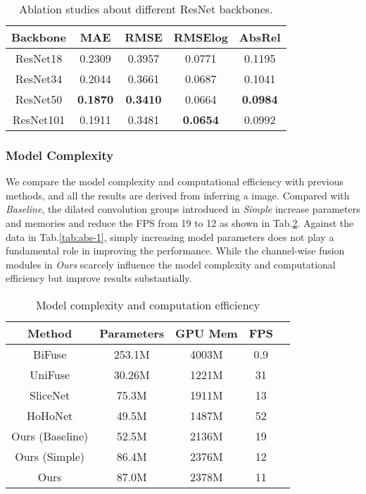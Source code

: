 \documentclass[letterpaper]{article} \usepackage{aaai21}  \usepackage{times}  \usepackage{helvet} \usepackage{courier}  \usepackage[hyphens]{url}  \usepackage{graphicx} \urlstyle{rm} \def\UrlFont{\rm}  \usepackage{natbib}  \usepackage{caption} \frenchspacing  \setlength{\pdfpagewidth}{8.5in}  \setlength{\pdfpageheight}{11in}
\newcommand{\newchange}[1]{{\color{black}#1}}
\begin{document}
\begin{table}[tb]
    \centering
    \begin{tabular}{ccccc} 
\toprule 
Backbone & MAE & RMSE & RMSElog &  AbsRel \\
\midrule 
ResNet18 & 0.2309 & 0.3957 & 0.0771 & 0.1195 \\
ResNet34 & 0.2044 & 0.3661 & 0.0687 & 0.1041 \\
ResNet50 & \textbf{0.1870} & \textbf{0.3410} & 0.0664 & \textbf{0.0984} \\
ResNet101 & 0.1911 & 0.3481 & \textbf{0.0654} & 0.0992 \\ 
\bottomrule
    \end{tabular}
    \caption{Ablation studies about different ResNet backbones.}
    \label{tab:abs-6}
\end{table}

\newchange{
\subsubsection{Model Complexity}
We compare the model complexity and computational efficiency with previous methods, and all the results are derived from inferring a  image.
Compared with \textit{Baseline}, the dilated convolution groups introduced in \textit{Simple} increase  parameters and  memories and reduce the FPS from 19 to 12 as shown in Tab.\ref{tab:abs-7}.
Against the data in Tab.\ref{tab:abs-1}, simply increasing model parameters does not play a fundamental role in improving the performance. While the channel-wise fusion modules in \textit{Ours} scarcely influence the model complexity and computational efficiency but improve results substantially.

\begin{table}[tb]
\centering
\small
\begin{tabular}{ccccc} 
\toprule 
Method & Parameters & GPU Mem & FPS\\
\midrule 
BiFuse & 253.1M & 4003M & 0.9 \\
UniFuse & 30.26M & 1221M & 31 \\
SliceNet & 75.3M & 1911M & 13 \\
HoHoNet & 49.5M & 1487M & 52 \\
Ours (Baseline)  & 52.5M & 2136M & 19 \\
Ours (Simple) & 86.4M & 2376M & 12 \\
Ours & 87.0M & 2378M & 11 \\
\bottomrule
\end{tabular}
\caption{Model complexity and computation efficiency}
\label{tab:abs-7}
\end{table}

}
\end{document}
